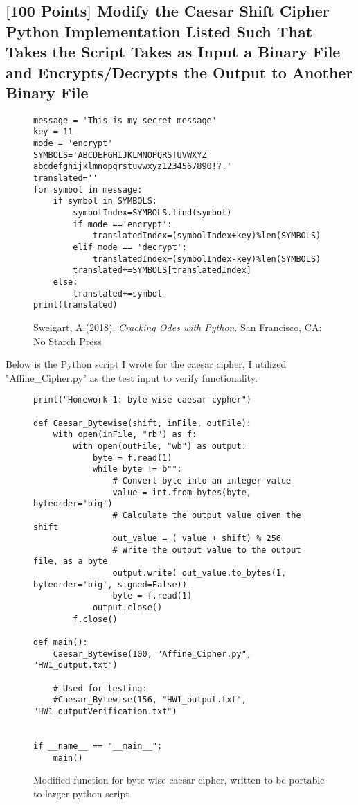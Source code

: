 \documentclass{article}
\begin{document}
\subsection*{[100 Points] Modify the Caesar Shift Cipher Python Implementation Listed Such That Takes the Script Takes as Input a Binary File and Encrypts/Decrypts the Output to Another Binary File}
\begin{figure}[H]
\begin{lstlisting}
message = 'This is my secret message'
key = 11
mode = 'encrypt'
SYMBOLS='ABCDEFGHIJKLMNOPQRSTUVWXYZ abcdefghijklmnopqrstuvwxyz1234567890!?.'
translated=''
for symbol in message:
    if symbol in SYMBOLS:
        symbolIndex=SYMBOLS.find(symbol)
        if mode =='encrypt':
            translatedIndex=(symbolIndex+key)%len(SYMBOLS)
        elif mode == 'decrypt':
            translatedIndex=(symbolIndex-key)%len(SYMBOLS)
        translated+=SYMBOLS[translatedIndex]
    else:
        translated+=symbol
print(translated)
\end{lstlisting}
\vspace{-1cm}
\caption*{Sweigart, A.(2018). \emph{Cracking Odes with Python}. San Francisco, CA: No Starch Press}
\end{figure}

Below is the Python script I wrote for the caesar cipher, I utilized "Affine\_Cipher.py" as the test input to verify functionality.
\begin{figure}[H]
\begin{lstlisting}
print("Homework 1: byte-wise caesar cypher")

def Caesar_Bytewise(shift, inFile, outFile):
	with open(inFile, "rb") as f:
		with open(outFile, "wb") as output:
			byte = f.read(1)
			while byte != b"":
				# Convert byte into an integer value
				value = int.from_bytes(byte, byteorder='big')
				# Calculate the output value given the shift
				out_value = ( value + shift) % 256
				# Write the output value to the output file, as a byte
				output.write( out_value.to_bytes(1, byteorder='big', signed=False))
				byte = f.read(1)
			output.close()
		f.close()

def main():
	Caesar_Bytewise(100, "Affine_Cipher.py", "HW1_output.txt")
	
	# Used for testing:
	#Caesar_Bytewise(156, "HW1_output.txt", "HW1_outputVerification.txt")


if __name__ == "__main__":
	main()
\end{lstlisting}
\vspace{-1cm}
\caption*{Modified function for byte-wise caesar cipher, written to be portable to larger python script}
\end{figure}
\end{document}
